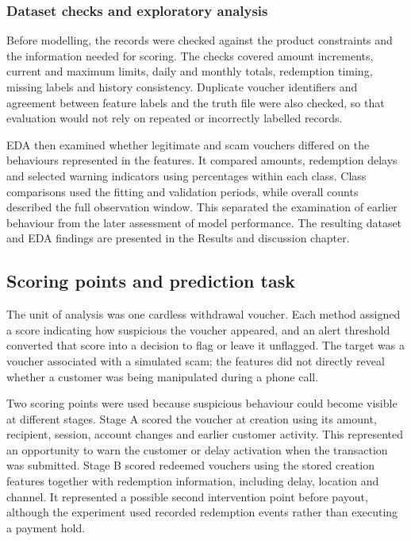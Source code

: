 \documentclass[11pt,a4paper]{article}
\begin{document}
\subsubsection*{Dataset checks and exploratory analysis}

Before modelling, the records were checked against the product constraints and the information needed for scoring. The checks covered amount increments, current and maximum limits, daily and monthly totals, redemption timing, missing labels and history consistency. Duplicate voucher identifiers and agreement between feature labels and the truth file were also checked, so that evaluation would not rely on repeated or incorrectly labelled records.

EDA then examined whether legitimate and scam vouchers differed on the behaviours represented in the features. It compared amounts, redemption delays and selected warning indicators using percentages within each class. Class comparisons used the fitting and validation periods, while overall counts described the full observation window. This separated the examination of earlier behaviour from the later assessment of model performance. The resulting dataset and EDA findings are presented in the Results and discussion chapter.

\subsection{Scoring points and prediction task}

The unit of analysis was one cardless withdrawal voucher. Each method assigned a score indicating how suspicious the voucher appeared, and an alert threshold converted that score into a decision to flag or leave it unflagged. The target was a voucher associated with a simulated scam; the features did not directly reveal whether a customer was being manipulated during a phone call.

Two scoring points were used because suspicious behaviour could become visible at different stages. Stage A scored the voucher at creation using its amount, recipient, session, account changes and earlier customer activity. This represented an opportunity to warn the customer or delay activation when the transaction was submitted. Stage B scored redeemed vouchers using the stored creation features together with redemption information, including delay, location and channel. It represented a possible second intervention point before payout, although the experiment used recorded redemption events rather than executing a payment hold.
\end{document}
